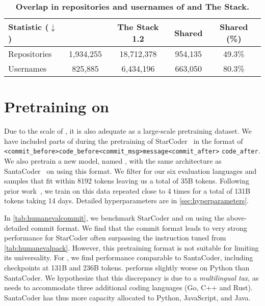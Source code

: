 \begin{table*}[htbp]
    \centering
    \begin{tabular}{l|cc|cc}
    \toprule
    Statistic ($\downarrow$) & \data{} & The Stack 1.2 & Shared & Shared (\%) \\
    \midrule
    Repositories & 1,934,255 & 18,712,378 & 954,135 & 49.3\% \\
    Usernames & 825,885 & 6,434,196 & 663,050 & 80.3\% \\
    \bottomrule
    \end{tabular}
    \caption{
        \textbf{Overlap in repositories and usernames of \data{} and The Stack.}
    }
    \label{tab:overlap}
\end{table*}

\FloatBarrier


\section{Pretraining on \data{}}
\label{sec:pretraining}

Due to the scale of \data{}, it is also adequate as a large-scale pretraining dataset. We have included parts of \data{} during the pretraining of StarCoder~\citep{li2023starcoder} in the format of \verb|<commit_before>code_before<commit_msg>message<commit_after>| \verb|code_after|.
We also pretrain a new model, named \modelsc{}, with the same architecture as SantaCoder~\citep{allal2023santacoder} on \data{} using this format. We filter \data{} for our six evaluation languages and samples that fit within 8192 tokens leaving us a total of 35B tokens. Following prior work~\citep{muennighoff2023scaling}, we train on this data repeated close to 4 times for a total of 131B tokens taking 14 days. Detailed hyperparameters are in \autoref{sec:hyperparameters}.

In \autoref{tab:humanevalcommit}, we benchmark StarCoder and \modelsc{} on \evalf{} using the above-detailed commit format. We find that the commit format leads to very strong performance for StarCoder often surpassing the instruction tuned \model{} from \autoref{tab:humanevalpack}. However, this pretraining format is not suitable for \evale{} limiting its universality.
For \modelsc{}, we find performance comparable to SantaCoder, including checkpoints at 131B and 236B tokens. \modelsc{} performs slightly worse on Python than SantaCoder. We hypothesize that this discrepancy is due to a \textit{multilingual tax}, as \modelsc{} needs to accommodate three additional coding languages (Go, C++ and Rust). SantaCoder has thus more capacity allocated to Python, JavaScript, and Java.

